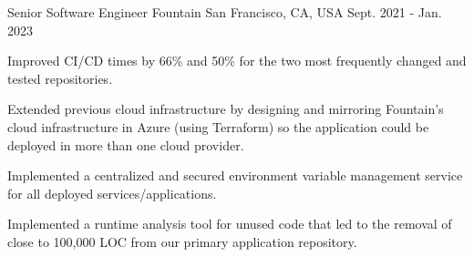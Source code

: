 

\begin{cventries}

  \cventry
  {Senior Software Engineer} %
  {Fountain} %
  {San Francisco, CA, USA} %
  {Sept. 2021 - Jan. 2023} %
  {
    \begin{cvitems} %
      \item {Improved CI/CD times by 66\% and 50\% for the two most frequently changed and tested repositories.}
      \item {Extended previous cloud infrastructure by designing and mirroring Fountain's cloud infrastructure in Azure (using Terraform) so the application could be deployed in more than one cloud provider.}
      \item {Implemented a centralized and secured environment variable management service for all deployed services/applications.}
      \item {Implemented a runtime analysis tool for unused code that led to the removal of close to 100,000 LOC from our primary application repository.}
    \end{cvitems}
  }



\end{cventries}
